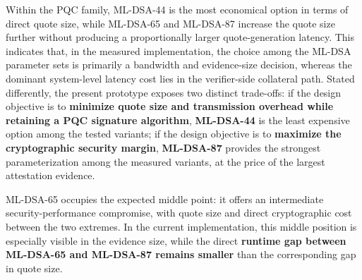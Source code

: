 Within the PQC family, ML-DSA-44 is the most economical option in terms of
direct quote size, while ML-DSA-65 and ML-DSA-87 increase the quote size
further without producing a proportionally larger quote-generation latency.
This indicates that, in the measured implementation, the choice among the
ML-DSA parameter sets is primarily a bandwidth and evidence-size decision,
whereas the dominant system-level latency cost lies in the verifier-side
collateral path. Stated differently, the present prototype exposes two
distinct trade-offs: if the design objective is to \textbf{minimize quote size and
transmission overhead while retaining a PQC signature algorithm}, \textbf{ML-DSA-44} is
the least expensive option among the tested variants; if the design objective
is to \textbf{maximize the cryptographic security margin}, \textbf{ML-DSA-87} provides the
strongest parameterization among the measured variants, at the price of the
largest attestation evidence.

ML-DSA-65 occupies the expected middle point: it offers an intermediate
security-performance compromise, with quote size and direct cryptographic cost
between the two extremes. In the current implementation, this middle position
is especially visible in the evidence size, while the direct \textbf{runtime gap
between ML-DSA-65 and ML-DSA-87 remains smaller} than the corresponding gap in
quote size.
